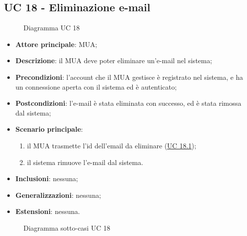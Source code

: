 
\subsection{UC 18 - Eliminazione e-mail} \label{sec:UC18}
    \begin{figure}[h]
        \centering
        \caption{Diagramma UC 18}
    \end{figure}
    \begin{itemize}
        \item \textbf{Attore principale}: MUA;
        \item \textbf{Descrizione}: il MUA deve poter eliminare un'e-mail nel sistema;
        \item \textbf{Precondizioni}: l’account che il MUA gestisce è registrato nel sistema, e ha un connessione aperta con il sistema ed è autenticato;
        \item \textbf{Postcondizioni}: l'e-mail è stata eliminata con successo, ed è stata rimossa dal sistema;
        \item \textbf{Scenario principale}:
            \begin{enumerate}
                \item il MUA trasmette l'id dell'email da eliminare (\hyperref[sec:UC18.1]{UC 18.1});
                \item il sistema rimuove l'e-mail dal sistema.
            \end{enumerate}
        \item \textbf{Inclusioni}: nessuna;
        \item \textbf{Generalizzazioni}: nessuna;
        \item \textbf{Estensioni}: nessuna.
    \end{itemize}

    \begin{figure}[h]
        \centering
        \caption{Diagramma sotto-casi UC 18}
    \end{figure}



